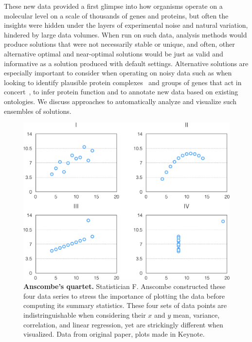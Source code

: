 \documentclass[12pt]{cmuthesis}
\begin{document}

These new data provided a first glimpse into how organisms operate on a molecular level on a scale of thousands of genes and proteins, but often the insights were hidden under the layers of experimental noise and natural variation, hindered by large data volumes. When run on such data, analysis methods would produce solutions that were not necessarily stable or unique, and often, other alternative optimal and near-optimal solutions would be just as valid and informative as a solution produced with default settings. Alternative solutions are especially important to consider when operating on noisy data such as when looking to identify plausible protein complexes~\cite{ppiClustering} and groups of genes that act in concert~\cite{geneInteractionGroups}, to infer protein function and to annotate new data based on existing ontologies. We discuss approaches to automatically analyze and visualize such ensembles of solutions.
 

\begin{figure}[ht]
  \centering
  \includegraphics[width=0.8\linewidth]{figures/anscombes_quartet}
  \caption{\textbf{Anscombe's quartet.} Statistician F. Anscombe constructed these four data series to stress the importance of plotting the data before computing its summary statistics. These four sets of data points are indistringuishable when considering their $x$ and $y$ mean, variance, correlation, and linear regression, yet are strickingly different when visualized. Data from original paper, plots made in Keynote.}
  \label{fig:intro:anscombe}
\end{figure}
\end{document}
